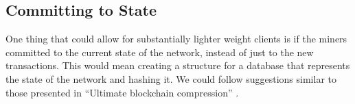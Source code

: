 \documentclass[twocolumn]{article}
\begin{document}
\subsection{Committing to State}
One thing that could allow for substantially lighter weight clients is if the miners committed to the current state of the network, instead of just to the new transactions.
This would mean creating a structure for a database that represents the state of the network and hashing it.
We could follow suggestions similar to those presented in ``Ultimate blockchain compression'' \cite{ubc}.





\end{document}

